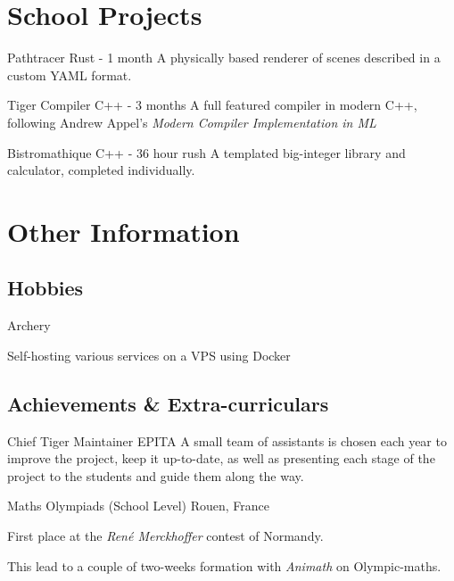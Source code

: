 \documentclass[letterpaper]{twentysecondcv} %
\begin{document}
\section{School Projects}

\begin{twenty}

    {Pathtracer}
    {Rust - 1 month}
    {A physically based renderer of scenes described in a custom YAML format.}

    {Tiger Compiler}
    {C++ - 3 months}
    {A full featured compiler in modern C++, following Andrew Appel's
    \textit{Modern Compiler Implementation in ML}}

    {Bistromathique}
    {C++ - 36 hour rush}
    {A templated big-integer library and calculator, completed individually.}

\end{twenty}



\section{Other Information}

\subsection{Hobbies}

\begin{twenty}

  \twentyitemshort{}
    {Archery}

  \twentyitemshort{}
    {Self-hosting various services on a VPS using Docker}

\end{twenty}

\subsection{Achievements \& Extra-curriculars}

\begin{twenty}

    {Chief Tiger Maintainer}
    {EPITA}
    {A small team of assistants is chosen each year to improve the project, keep
    it up-to-date, as well as presenting each stage of the project to the
    students and guide them along the way.}

    {Maths Olympiads (School Level)}
    {Rouen, France}
    {First place at the \textit{René Merckhoffer} contest of Normandy.

    This lead to a couple of two-weeks formation with \textit{Animath} on
    Olympic-maths.}

\end{twenty}
\end{document}
